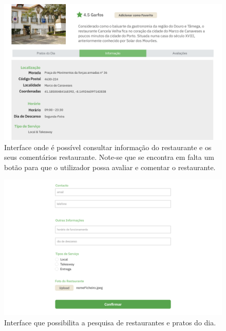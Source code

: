 \documentclass[a4paper,12pt]{report}
\begin{document}
	\begin{figure}[H]
	\begin{center}
	\includegraphics[scale=0.25]{10.1-Screen7}	
	\end{center}
	\caption{Interface onde é possível consultar informação do restaurante e os seus comentários restaurante. Note-se que se encontra em falta um botão para que o utilizador possa avaliar e comentar o restaurante.}
	\end{figure} 
	
	\begin{figure}[H]
	\begin{center}
	\includegraphics[scale=0.25]{6.1-Screen12}	
	\end{center}
	\caption{Interface que possibilita a pesquisa de restaurantes e pratos do dia.}
	\end{figure} 
\end{document}
